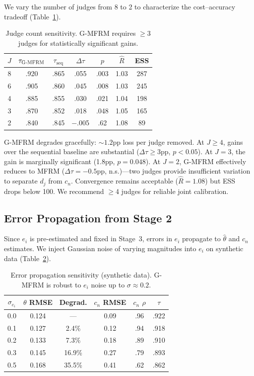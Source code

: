 \documentclass[11pt,twocolumn]{article}
\newcommand{\thetahat}{\hat{\theta}}
\newcommand{\gmfrm}{\textsc{G-MFRM}}
\begin{document}
We vary the number of judges from 8 to 2 to characterize the cost--accuracy tradeoff (Table~\ref{tab:judges_sens}).

\begin{table}[t]
\centering
\small
\caption{Judge count sensitivity. \gmfrm{} requires $\geq$3 judges for statistically significant gains.}
\label{tab:judges_sens}
\begin{tabular}{@{}ccccccc@{}}
\toprule
$J$ & $\tau_{\gmfrm{}}$ & $\tau_{\text{seq}}$ & $\Delta\tau$ & $p$ & $\hat{R}$ & ESS \\
\midrule
8 & .920 & .865 & .055 & .003 & 1.03 & 287 \\
6 & .905 & .860 & .045 & .008 & 1.03 & 245 \\
4 & .885 & .855 & .030 & .021 & 1.04 & 198 \\
3 & .870 & .852 & .018 & .048 & 1.05 & 165 \\
2 & .840 & .845 & $-$.005 & .62  & 1.08 & 89  \\
\bottomrule
\end{tabular}
\end{table}

\gmfrm{} degrades gracefully: ${\sim}1.2$pp loss per judge removed. At $J \geq 4$, gains over the sequential baseline are substantial ($\Delta\tau \geq 3$pp, $p < 0.05$). At $J=3$, the gain is marginally significant (1.8pp, $p=0.048$). At $J=2$, \gmfrm{} effectively reduces to MFRM ($\Delta\tau = -0.5$pp, n.s.)---two judges provide insufficient variation to separate $d_j$ from $c_n$. Convergence remains acceptable ($\hat{R}=1.08$) but ESS drops below 100. We recommend $\geq$4 judges for reliable joint calibration.

\subsection{Error Propagation from Stage 2}

Since $e_i$ is pre-estimated and fixed in Stage~3, errors in $e_i$ propagate to $\thetahat$ and $c_n$ estimates. We inject Gaussian noise of varying magnitudes into $e_i$ on synthetic data (Table~\ref{tab:error}).

\begin{table}[t]
\centering
\small
\caption{Error propagation sensitivity (synthetic data). \gmfrm{} is robust to $e_i$ noise up to $\sigma \approx 0.2$.}
\label{tab:error}
\begin{tabular}{@{}cccccc@{}}
\toprule
$\sigma_{e_i}$ & $\theta$ RMSE & Degrad. & $c_n$ RMSE & $c_n$ $\rho$ & $\tau$ \\
\midrule
0.0 & 0.124 & ---    & 0.09 & .96 & .922 \\
0.1 & 0.127 & 2.4\%  & 0.12 & .94 & .918 \\
0.2 & 0.133 & 7.3\%  & 0.18 & .89 & .910 \\
0.3 & 0.145 & 16.9\% & 0.27 & .79 & .893 \\
0.5 & 0.168 & 35.5\% & 0.41 & .62 & .862 \\
\bottomrule
\end{tabular}
\end{table}
\end{document}
